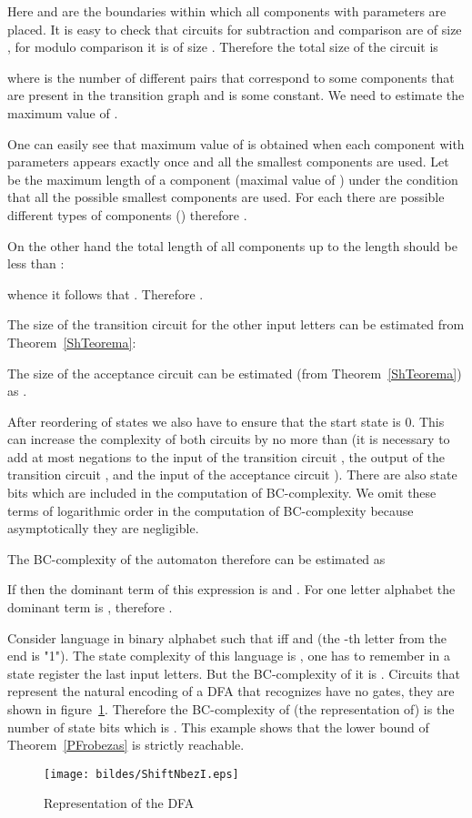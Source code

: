 \documentclass[copyright, creativecommons]{eptcs}
\newcommand{\qed}{}
\newenvironment{proof}[1][Proof]{\begin{trivlist}
\item[\hskip \labelsep {\bfseries #1}]}{\end{trivlist}}
\begin{document}
\begin{proof}
Here  and  are the boundaries within which all components with parameters  are placed.
It is easy to check that circuits for subtraction  and comparison  are of size ,
for modulo comparison  it is of size . Therefore
the total size of the circuit  is

where  is the number of different pairs  that correspond to some components
that are present in the transition graph and 
is some constant. We need to estimate the maximum value of .

One can easily see that maximum value of  is obtained when
each component with parameters  appears exactly once and all the smallest components are used.
Let  be the maximum length of a component (maximal value of ) under the condition
that all the possible smallest components are used.
For each  there are  possible different types of components () therefore 
. 

On the other hand the total length of all components up to the length  should be less than :

whence it follows that .
Therefore
.

The size of the transition circuit  for the other  input letters can be estimated from Theorem~\ref{ShTeorema}:


The size of the acceptance circuit can be estimated (from Theorem~\ref{ShTeorema}) as
.

After reordering of states we also have to ensure that the start state is 0. This
can increase the complexity of both circuits by no more than  (it is
necessary to add at most  negations to the input of the transition circuit , the output of the transition
circuit , and the input of the acceptance circuit ). There are also
 state bits which are included in the computation of BC-complexity.
We omit these terms of logarithmic order in the computation of BC-complexity because
asymptotically they are negligible.

The BC-complexity of the automaton therefore can be estimated as


If  then the dominant term of this expression is  and .
For one letter alphabet the dominant term is , therefore .
\qed
\end{proof}


Consider language  in binary alphabet  such that 
iff  and  (the -th letter from the end is "1"). The state complexity
of this language is , one has to remember in a state register the last  input letters. But the BC-complexity of it is .
Circuits  that represent the natural encoding of a DFA  that recognizes  have no gates,
they are shown in figure~\ref{ShiftN}. Therefore the BC-complexity of (the representation  of) 
is the number of state bits which is .
This example shows that the lower bound of Theorem~\ref{PFrobezas} is strictly reachable.
\begin{figure}[htb]
	\centering
		\texttt{[image: bildes/ShiftNbezI.eps]}
	\caption{Representation  of the DFA }
	\label{ShiftN}
\end{figure}
\end{document}
